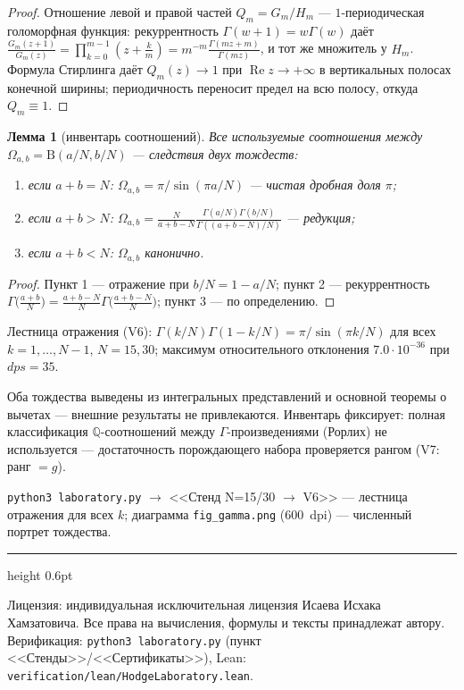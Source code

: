 \documentclass[11pt,a4paper]{article}
\theoremstyle{plain}
\newtheorem{lemma}[theorem]{Лемма}
\theoremstyle{definition}
\theoremstyle{remark}
\newcommand{\QQ}{\mathbb{Q}}
\newcommand{\Ga}{\Gamma}
\newcommand{\Bfun}{\mathrm{B}}
\newcommand{\re}{\operatorname{Re}}
\begin{document}
\begin{proof}
Отношение левой и правой частей $Q_m=G_m/H_m$ --- $1$-периодическая
голоморфная функция: рекуррентность $\Ga(w+1)=w\Ga(w)$ даёт
$\frac{G_m(z+1)}{G_m(z)}=\prod_{k=0}^{m-1}(z+\tfrac km)
=m^{-m}\frac{\Ga(mz+m)}{\Ga(mz)}$, и тот же множитель у $H_m$.
Формула Стирлинга даёт $Q_m(z)\to1$ при $\re z\to+\infty$ в
вертикальных полосах конечной ширины; периодичность переносит
предел на всю полосу, откуда $Q_m\equiv1$.
\end{proof}

\begin{lemma}[инвентарь соотношений]\label{lem:relations}
Все используемые соотношения между
$\Omega_{a,b}=\Bfun(a/N,b/N)$ --- следствия двух тождеств:
\begin{enumerate}[leftmargin=2em]
\item если $a+b=N$: $\Omega_{a,b}=\pi/\sin(\pi a/N)$ --- чистая
  дробная доля $\pi$;
\item если $a+b>N$:
  $\Omega_{a,b}=\frac{N}{a+b-N}
  \frac{\Ga(a/N)\Ga(b/N)}{\Ga((a+b-N)/N)}$ --- редукция;
\item если $a+b<N$: $\Omega_{a,b}$ канонично.
\end{enumerate}
\end{lemma}

\begin{proof}
Пункт 1 --- отражение при $b/N=1-a/N$; пункт 2 ---
рекуррентность $\Ga\bigl(\frac{a+b}N\bigr)=\frac{a+b-N}{N}
\Ga\bigl(\frac{a+b-N}N\bigr)$; пункт 3 --- по определению.
\end{proof}

\begin{databox}[числа]
Лестница отражения (V6): $\Ga(k/N)\Ga(1-k/N)=\pi/\sin(\pi k/N)$ для
всех $k=1,\dots,N-1$, $N=15,30$; максимум относительного отклонения
$7.0\cdot10^{-36}$ при $dps=35$.
\end{databox}

\begin{statusbox}[итог]
Оба тождества выведены из интегральных представлений и основной
теоремы о вычетах --- внешние результаты не привлекаются. Инвентарь
фиксирует: полная классификация $\QQ$-соотношений между
$\Ga$-произведениями (Рорлих) не используется --- достаточность
порождающего набора проверяется рангом (V7: ранг $=g$).
\end{statusbox}

\begin{verifybox}
\texttt{python3 laboratory.py} $\to$ <<Стенд N=15/30 $\to$ V6>> ---
лестница отражения для всех $k$; диаграмма
\texttt{fig\_gamma.png} ($600$~dpi) --- численный портрет тождества.
\end{verifybox}

\vfill
{\color{linkblue}\hrule height 0.6pt}
\vspace{0.5em}
{\small\color{gray}
Лицензия: индивидуальная исключительная лицензия Исаева Исхака Хамзатовича.
Все права на вычисления, формулы и тексты принадлежат автору.
Верификация: \texttt{python3 laboratory.py} (пункт <<Стенды>>/<<Сертификаты>>),
Lean: \texttt{verification/lean/HodgeLaboratory.lean}.
}
\end{document}
